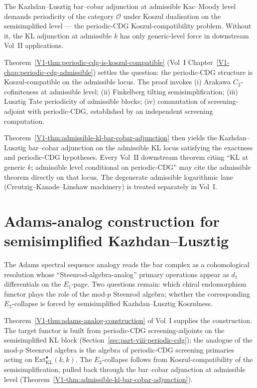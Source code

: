 The Kazhdan--Lusztig bar--cobar adjunction at admissible Kac--Moody
level demands periodicity of the category $\mathcal{O}$ under Koszul
dualisation on the semisimplified level — the periodic-CDG
Koszul-compatibility problem. Without it, the KL adjunction at
admissible $k$ has only generic-level force in downstream Vol~II
applications.

Theorem~\ref*{V1-thm:periodic-cdg-is-koszul-compatible}
(Vol~I Chapter~\ref*{V1-chap:periodic-cdg-admissible}) settles the
question: the periodic-CDG structure is Koszul-compatible on the
admissible locus. The proof invokes (i) Arakawa $C_{2}$-cofiniteness
at admissible level; (ii) Finkelberg tilting semisimplification;
(iii) Lusztig Tate periodicity of admissible blocks; (iv) commutation
of screening-adjoint with periodic-CDG, established by an independent
screening computation.

Theorem~\ref*{V1-thm:admissible-kl-bar-cobar-adjunction} then yields
the Kazhdan--Lusztig bar--cobar adjunction on the admissible KL locus
satisfying the exactness and periodic-CDG hypotheses. Every Vol~II
downstream theorem citing ``KL at generic $k$; admissible level
conditional on periodic-CDG'' may cite the admissible theorem directly
on that locus. The degenerate admissible logarithmic lane
(Creutzig--Kanade--Linshaw machinery) is treated separately in Vol~I.

\section{Adams-analog construction for semisimplified Kazhdan--Lusztig}
\label{sec:part-viii-adams-analog}

The Adams spectral sequence analogy reads the bar complex as a
cohomological resolution whose ``Steenrod-algebra-analog'' primary
operations appear as $d_{1}$ differentials on the $E_{1}$-page. Two
questions remain: which chiral endomorphism functor plays the role of
the mod-$p$ Steenrod algebra; whether the corresponding $E_{2}$-collapse
is forced by semisimplified Kazhdan--Lusztig Koszulness.

Theorem~\ref*{V1-thm:adams-analog-construction} of Vol~I supplies the
construction. The target functor is built from periodic-CDG
screening-adjoints on the semisimplified KL block
(Section~\ref{sec:part-viii-periodic-cdg}); the analogue of the
mod-$p$ Steenrod algebra is the algebra of periodic-CDG screening
primaries acting on $\mathrm{Ext}^{\bullet}_{\mathrm{KL}}(k,k)$. The
$E_{2}$-collapse follows from Koszul-compatibility of the
semisimplification, pulled back through the bar--cobar adjunction at
admissible level
(Theorem~\ref*{V1-thm:admissible-kl-bar-cobar-adjunction}).

